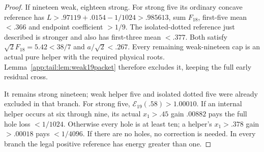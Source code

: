 \documentclass[11pt]{article}
\theoremstyle{definition}
\theoremstyle{remark}
\begin{document}
\begin{proof}
If nineteen weak, eighteen strong. For strong five its ordinary
concave reference has $L>.97119+.0154-1/1024>.985613$,
sum $F_{18}$, first-five mean $<.366$ and endpoint coefficient
$>1/9$. The isolated-dotted reference just described is stronger
and also has first-three mean $<.377$. Both satisfy
$\sqrt2F_{18}=5.42<38/7$ and $a/\sqrt2<.267$.
Every remaining weak-nineteen cap is an actual pure helper with
the required physical roots. Lemma~\ref{app:tail:lem:weak19packet}
therefore excludes it, keeping the full early residual cross.

It remains strong nineteen; weak helper five and isolated dotted
five were already excluded in that branch. For strong five,
$\mathcal E_{19}(.58)>1.00010$. If an internal helper occurs
at six through nine, its actual $x_1>.45$ gain $.00882$ pays
the full hole loss $<1/1024$. Otherwise every hole is at least
ten; a helper's $x_1>.378$ gain $>.00018$ pays $<1/4096$.
If there are no holes, no correction is needed. In every branch
the legal positive reference has energy greater than one.
\end{proof}
\end{document}
